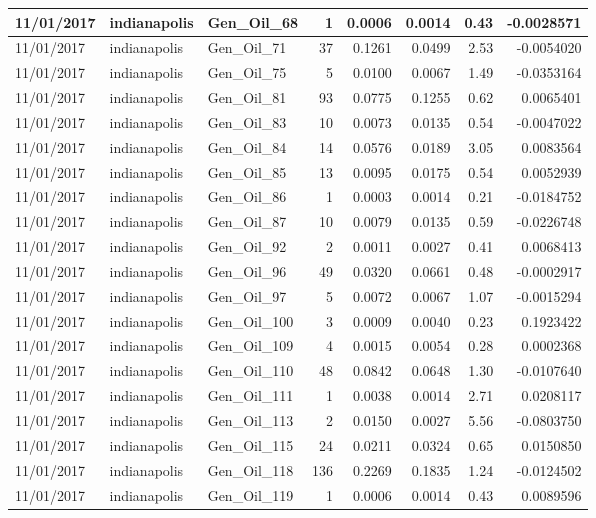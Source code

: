 \documentclass[
  letterpaper,
  DIV=11,
  numbers=noendperiod]{scrartcl}
\begin{document}
\begin{tabular}{l|l|l|r|r|r|r|r}
\hline
11/01/2017 & indianapolis & Gen\_Oil\_68 & 1 & 0.0006 & 0.0014 & 0.43 & -0.0028571\\
\hline
11/01/2017 & indianapolis & Gen\_Oil\_71 & 37 & 0.1261 & 0.0499 & 2.53 & -0.0054020\\
\hline
11/01/2017 & indianapolis & Gen\_Oil\_75 & 5 & 0.0100 & 0.0067 & 1.49 & -0.0353164\\
\hline
11/01/2017 & indianapolis & Gen\_Oil\_81 & 93 & 0.0775 & 0.1255 & 0.62 & 0.0065401\\
\hline
11/01/2017 & indianapolis & Gen\_Oil\_83 & 10 & 0.0073 & 0.0135 & 0.54 & -0.0047022\\
\hline
11/01/2017 & indianapolis & Gen\_Oil\_84 & 14 & 0.0576 & 0.0189 & 3.05 & 0.0083564\\
\hline
11/01/2017 & indianapolis & Gen\_Oil\_85 & 13 & 0.0095 & 0.0175 & 0.54 & 0.0052939\\
\hline
11/01/2017 & indianapolis & Gen\_Oil\_86 & 1 & 0.0003 & 0.0014 & 0.21 & -0.0184752\\
\hline
11/01/2017 & indianapolis & Gen\_Oil\_87 & 10 & 0.0079 & 0.0135 & 0.59 & -0.0226748\\
\hline
11/01/2017 & indianapolis & Gen\_Oil\_92 & 2 & 0.0011 & 0.0027 & 0.41 & 0.0068413\\
\hline
11/01/2017 & indianapolis & Gen\_Oil\_96 & 49 & 0.0320 & 0.0661 & 0.48 & -0.0002917\\
\hline
11/01/2017 & indianapolis & Gen\_Oil\_97 & 5 & 0.0072 & 0.0067 & 1.07 & -0.0015294\\
\hline
11/01/2017 & indianapolis & Gen\_Oil\_100 & 3 & 0.0009 & 0.0040 & 0.23 & 0.1923422\\
\hline
11/01/2017 & indianapolis & Gen\_Oil\_109 & 4 & 0.0015 & 0.0054 & 0.28 & 0.0002368\\
\hline
11/01/2017 & indianapolis & Gen\_Oil\_110 & 48 & 0.0842 & 0.0648 & 1.30 & -0.0107640\\
\hline
11/01/2017 & indianapolis & Gen\_Oil\_111 & 1 & 0.0038 & 0.0014 & 2.71 & 0.0208117\\
\hline
11/01/2017 & indianapolis & Gen\_Oil\_113 & 2 & 0.0150 & 0.0027 & 5.56 & -0.0803750\\
\hline
11/01/2017 & indianapolis & Gen\_Oil\_115 & 24 & 0.0211 & 0.0324 & 0.65 & 0.0150850\\
\hline
11/01/2017 & indianapolis & Gen\_Oil\_118 & 136 & 0.2269 & 0.1835 & 1.24 & -0.0124502\\
\hline
11/01/2017 & indianapolis & Gen\_Oil\_119 & 1 & 0.0006 & 0.0014 & 0.43 & 0.0089596\\

\end{tabular}
\end{document}
